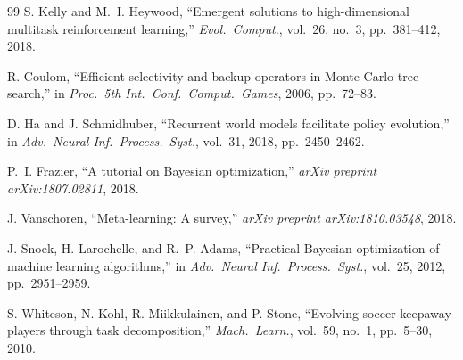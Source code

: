 \documentclass[conference]{IEEEtran}
\begin{document}
\begin{thebibliography}{99}
S. Kelly and M.~I. Heywood, ``Emergent solutions to high-dimensional multitask reinforcement learning,'' \emph{Evol.\ Comput.}, vol.~26, no.~3, pp.~381--412, 2018.

R. Coulom, ``Efficient selectivity and backup operators in Monte-Carlo tree search,'' in \emph{Proc.\ 5th Int.\ Conf.\ Comput.\ Games}, 2006, pp.~72--83.

D. Ha and J. Schmidhuber, ``Recurrent world models facilitate policy evolution,'' in \emph{Adv.\ Neural Inf.\ Process.\ Syst.}, vol.~31, 2018, pp.~2450--2462.

P.~I. Frazier, ``A tutorial on Bayesian optimization,'' \emph{arXiv preprint arXiv:1807.02811}, 2018.

J. Vanschoren, ``Meta-learning: A survey,'' \emph{arXiv preprint arXiv:1810.03548}, 2018.

J. Snoek, H. Larochelle, and R.~P. Adams, ``Practical Bayesian optimization of machine learning algorithms,'' in \emph{Adv.\ Neural Inf.\ Process.\ Syst.}, vol.~25, 2012, pp.~2951--2959.

S. Whiteson, N. Kohl, R. Miikkulainen, and P. Stone, ``Evolving soccer keepaway players through task decomposition,'' \emph{Mach.\ Learn.}, vol.~59, no.~1, pp.~5--30, 2010.

\end{thebibliography}
\end{document}
